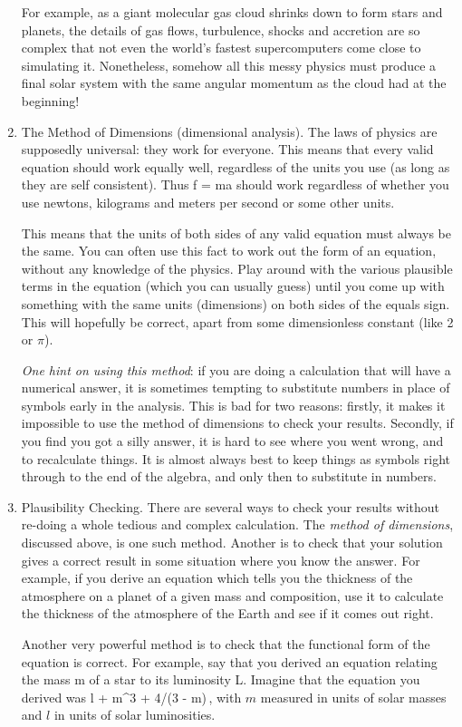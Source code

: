 \begin{enumerate}
For example, as a giant molecular gas cloud shrinks down to form stars and planets, the details of gas flows, turbulence, shocks and accretion are so complex that not even the world's fastest supercomputers come close to simulating it. Nonetheless, somehow all this messy physics must produce a final solar system with the same angular momentum as the cloud had at the beginning!
%
\item The Method of Dimensions (dimensional analysis). The laws of physics are supposedly universal: they work for everyone. This means that every valid equation should work equally well, regardless of the units you use (as long as they are self consistent). Thus
\beq
f = ma
\eeq
should work regardless of whether you use newtons, kilograms and meters per second or some other units. 

This means that the units of both sides of any valid equation must always be the same. You can often use this fact to work out the form of an equation, without any knowledge of the physics. Play around with the various plausible terms in the equation (which you can usually guess) until you come up with something with the same units (dimensions) on both sides of the equals sign. This will hopefully be correct, apart from some dimensionless constant (like 2 or $\pi$).

\emph{One hint on using this method}: if you are doing a calculation that will have a numerical answer, it is sometimes tempting to substitute numbers in place of symbols early in the analysis. This is bad for two reasons: firstly, it makes it impossible to use the method of dimensions to check your results. Secondly, if you find you got a silly answer, it is hard to see where you went wrong, and to recalculate things. It is almost always best to keep things as symbols right through to the end of the algebra, and only then to substitute in numbers.
%
\item Plausibility Checking. There are several ways to check your results without re-doing a whole tedious and complex calculation. The \emph{method of dimensions}, discussed above, is one such method. Another is to check that your solution gives a correct result in some situation where you know the answer. For example, if you derive an equation which tells you the thickness of the atmosphere on a planet of a given mass and composition, use it to calculate the thickness of the atmosphere of the Earth and see if it comes out right.

Another very powerful method is to check that the functional form of the equation is correct. For example, say that you derived an equation relating the mass m of a star to its luminosity L. Imagine that the equation you derived was
\beq
l  + m^3 + 4\pi/(3 - m)\,,
\eeq
with $m$ measured in units of solar masses and $l$ in units of solar luminosities.


\end{enumerate}
